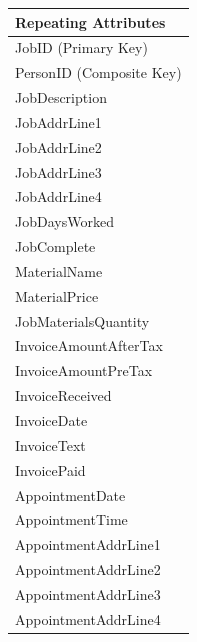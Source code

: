 \begin{flushleft}
\begin{longtable}{|p{12cm}|}
			\textbf{Repeating Attributes} \\ \hline
			JobID (Primary Key) \\
			PersonID (Composite Key) \\
         JobDescription \\
			JobAddrLine1 \\
			JobAddrLine2 \\
			JobAddrLine3 \\
			JobAddrLine4 \\
			JobDaysWorked \\
			JobComplete \\
			MaterialName \\
			MaterialPrice \\
			JobMaterialsQuantity \\
			InvoiceAmountAfterTax \\
			InvoiceAmountPreTax \\
			InvoiceReceived \\
			InvoiceDate \\
			InvoiceText \\
			InvoicePaid \\
			AppointmentDate \\
			AppointmentTime \\
			AppointmentAddrLine1 \\
			AppointmentAddrLine2 \\
			AppointmentAddrLine3	\\
			AppointmentAddrLine4 \\ \hline
			
    \end{longtable}
\end{flushleft}

